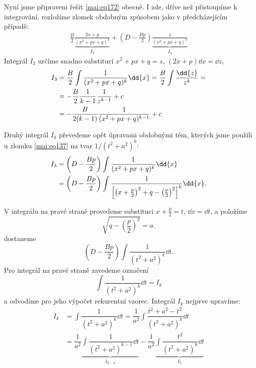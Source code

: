       Nyní jsme připraveni řešit \ref{mai:eq172} obecně. I zde, dříve než přistoupíme k integrování,
      rozložíme zlomek obdobným způsobem jako v předcházejícím případě:
      \begin{gather*}
        \frac{B}{2}\underbrace{\frac{2x + p}{(x^2+px+q)^k}}_{I_3} + 
        \left(D - \frac{Bp}{2}\right)\underbrace{\frac{1}{(x^2+px+q)^k}}_{I_4}
      \end{gather*} 
      Integrál \(I_3\) určíme snadno substitucí \(x^2+px+q = z\), \((2x+p)\dd{x} = \dd{z}\),
      \begin{align}
        I_3 &= \frac{B}{2}\int\dfrac{1}{(x^2+px+q)^k}\dd{x} 
             = \frac{B}{2}\int\dfrac{\dd{z}}{z^k} =                                \notag   \\
            &=-\frac{B}{2}\dfrac{1}{k-1}\dfrac{1}{z^{k-1}} + c                     \notag   \\
            &=-\frac{B}{2(k-1)}\dfrac{1}{(x^2+px+q)^{k-1}} + c                     \label{mai:eq173} 
      \end{align}      

      Druhý integrál \(I_4\) převedeme opět úpravami obdobnými těm, kterých jsme použili u zlomku
      \ref{mai:eq137} na tvar \(1/(t^2+a^2)^k\):
      \begin{align*}
        I_3 &= \left(D - \frac{Bp}{2}\right)\int\dfrac{1}{(x^2+px+q)^k}\dd{x}      \notag   \\  
            &= \left(D - \frac{Bp}{2}\right)\int\dfrac{1}{
                  \left[
                    \left(
                      x+\frac{p}{2}
                    \right)^2+q-
                    \left(
                      \frac{p}{2}
                    \right)^2
                  \right]^k
                }\dd{x}.
      \end{align*}    

      V integrálu na pravé straně provedeme substituci \(x + \frac{p}{2} = t\), \(\dd{x} = \dd{t}\),
      a položíme 
      \begin{equation*}
        \sqrt{q - \left(\dfrac{p}{2}\right)^2} = a.
      \end{equation*}
      dostaneme
      \begin{equation*}
        \left(D - \frac{Bp}{2}\right)\int\dfrac{1}{(t^2+a^2)^k}\dd{t}.
      \end{equation*}
      Pro integrál na pravé straně zavedeme označení
      \begin{equation*}
        \int\dfrac{1}{(t^2+a^2)^k}\dd{t} = I_k
      \end{equation*}
      a odvodíme pro jeho výpočet rekurentní vzorec. Integrál \(I_k\) nejprve upravíme:
      \begin{align*}
        I_k &= \int\dfrac{1}{(t^2+a^2)^k}\dd{t} 
             = \dfrac{1}{a^2}\int\dfrac{t^2+a^2-t^2}{(t^2+a^2)^k}\dd{t}                       \\
            &= \dfrac{1}{a^2}\underbrace{\int\dfrac{1}{(t^2+a^2)^{k-1}}\dd{t}}_{I_{k-1}}          
             - \dfrac{1}{a^2}\underbrace{\int\dfrac{t^2}{(t^2+a^2)^k}\dd{t}}_{I_5}                
      \end{align*}

